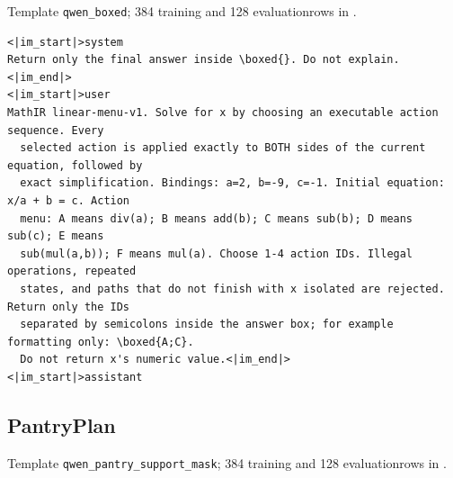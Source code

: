 \noindent Template \texttt{qwen\_boxed}; 384 training and 128 evaluation\linebreak rows in .

\begin{Verbatim}[fontsize=\scriptsize,frame=single,framesep=4pt,rulecolor=\color{black!25}]
<|im_start|>system
Return only the final answer inside \boxed{}. Do not explain.<|im_end|>
<|im_start|>user
MathIR linear-menu-v1. Solve for x by choosing an executable action sequence. Every
  selected action is applied exactly to BOTH sides of the current equation, followed by
  exact simplification. Bindings: a=2, b=-9, c=-1. Initial equation: x/a + b = c. Action
  menu: A means div(a); B means add(b); C means sub(b); D means sub(c); E means
  sub(mul(a,b)); F means mul(a). Choose 1-4 action IDs. Illegal operations, repeated
  states, and paths that do not finish with x isolated are rejected. Return only the IDs
  separated by semicolons inside the answer box; for example formatting only: \boxed{A;C}.
  Do not return x's numeric value.<|im_end|>
<|im_start|>assistant
\end{Verbatim}

\subsection{PantryPlan}
\label{app:prompt-pantry}

\noindent Template \texttt{qwen\_pantry\_support\_mask}; 384 training and 128 evaluation\linebreak rows in .

